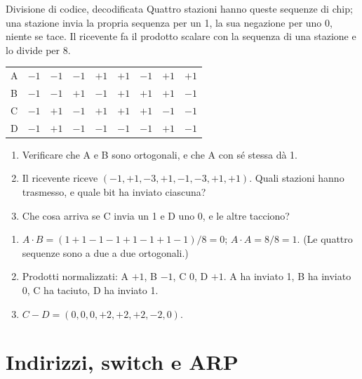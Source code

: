 \begin{esercizio}{Divisione di codice, decodificata}
Quattro stazioni hanno queste sequenze di chip; una stazione invia la propria sequenza per un 1, la sua negazione per uno 0, niente se
tace. Il ricevente fa il prodotto scalare con la sequenza di una stazione e lo divide per 8.
\begin{center}
\small
\begin{tabular}{l*{8}{r}}
\toprule
A & $-1$ & $-1$ & $-1$ & $+1$ & $+1$ & $-1$ & $+1$ & $+1$ \\
B & $-1$ & $-1$ & $+1$ & $-1$ & $+1$ & $+1$ & $+1$ & $-1$ \\
C & $-1$ & $+1$ & $-1$ & $+1$ & $+1$ & $+1$ & $-1$ & $-1$ \\
D & $-1$ & $+1$ & $-1$ & $-1$ & $-1$ & $-1$ & $+1$ & $-1$ \\
\bottomrule
\end{tabular}
\end{center}
\begin{enumerate}[label=(\alph*)]
    \item Verificare che A e B sono ortogonali, e che A con sé stessa dà 1.
    \item Il ricevente riceve $(-1, +1, -3, +1, -1, -3, +1, +1)$. Quali stazioni hanno trasmesso, e quale bit ha inviato ciascuna?
    \item Che cosa arriva se C invia un 1 e D uno 0, e le altre tacciono?
\end{enumerate}

\svolgimento
\begin{enumerate}[label=(\alph*)]
    \item $A \cdot B = (1 + 1 - 1 - 1 + 1 - 1 + 1 - 1)/8 = 0$; $A \cdot A = 8/8 = 1$. (Le quattro sequenze sono a due a due ortogonali.)
    \item Prodotti normalizzati: A $+1$, B $-1$, C $0$, D $+1$. A ha inviato 1, B ha inviato 0, C ha taciuto, D ha inviato 1.
    \item $C - D = (0, 0, 0, +2, +2, +2, -2, 0)$.
\end{enumerate}
\end{esercizio}

\section{Indirizzi, switch e ARP}

